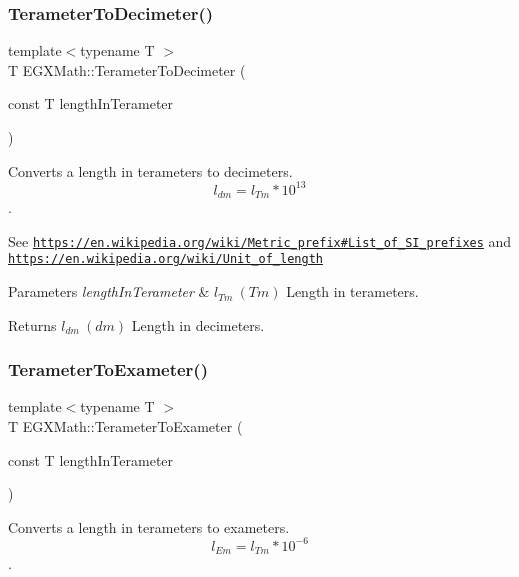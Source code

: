 \subsubsection{\texorpdfstring{Terameter\+To\+Decimeter()}{TerameterToDecimeter()}}
{\footnotesize\ttfamily template$<$typename T $>$ \\
T E\+G\+X\+Math\+::\+Terameter\+To\+Decimeter (\begin{DoxyParamCaption}\item[{const T}]{length\+In\+Terameter }\end{DoxyParamCaption})}



Converts a length in terameters to decimeters. \[ l_{dm}=l_{Tm} * 10^{13} \]. 

See \href{https://en.wikipedia.org/wiki/Metric_prefix#List_of_SI_prefixes}{\tt https\+://en.\+wikipedia.\+org/wiki/\+Metric\+\_\+prefix\#\+List\+\_\+of\+\_\+\+S\+I\+\_\+prefixes} and \href{https://en.wikipedia.org/wiki/Unit_of_length}{\tt https\+://en.\+wikipedia.\+org/wiki/\+Unit\+\_\+of\+\_\+length} 
\begin{DoxyParams}{Parameters}
{\em length\+In\+Terameter} & $ l_{Tm}\ (Tm)$ Length in terameters. \\
\hline
\end{DoxyParams}
\begin{DoxyReturn}{Returns}
$ l_{dm}\ (dm)$ Length in decimeters. 
\end{DoxyReturn}
\mbox{\label{group___e_g_x_math-_conversions-_length_conversions-_terameter-_s_i_ga9b268bd91e8ba4853c2732b80bca0539}} 
\subsubsection{\texorpdfstring{Terameter\+To\+Exameter()}{TerameterToExameter()}}
{\footnotesize\ttfamily template$<$typename T $>$ \\
T E\+G\+X\+Math\+::\+Terameter\+To\+Exameter (\begin{DoxyParamCaption}\item[{const T}]{length\+In\+Terameter }\end{DoxyParamCaption})}



Converts a length in terameters to exameters. \[ l_{Em}=l_{Tm} * 10^{-6} \]. 

